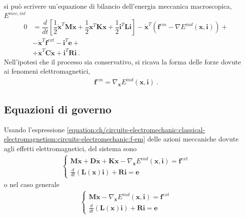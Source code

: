 \documentclass[letterpaper,10pt,english]{jupyterBook}
\begin{document}
\sphinxAtStartPar
si può scrivere un’equazione di bilancio dell’energia meccanica macroscopica, \(E^{mec, int}\)
\begin{equation*}
\begin{split}
0 & = \dfrac{d}{dt} \left[ \dfrac{1}{2} \dot{\mathbf{x}}^T \mathbf{M} \dot{\mathbf{x}} + \dfrac{1}{2} \mathbf{x}^T \mathbf{K} \mathbf{x} + \dfrac{1}{2} \mathbf{i}^T \mathbf{L} \mathbf{i} \right] - \dot{\mathbf{x}}^T \left( \mathbf{f}^{em} - \nabla E^{ind}(\mathbf{x}, \mathbf{i})  \right) + \\
  & - \dot{\mathbf{x}}^T \mathbf{f}^{ext} - \mathbf{i}^T \mathbf{e} + \\
  & + \dot{\mathbf{x}}^T \mathbf{C} \dot{\mathbf{x}} + \mathbf{i}^T \mathbf{R} \mathbf{i} \ .
\end{split}
\end{equation*}
\sphinxAtStartPar
Nell’ipotesi che il processo sia conservativo, si ricava la forma delle forze dovute ai fenomeni elettromagnetici,
\begin{equation}\label{equation:ch/circuits-electromechanic:classical-electromagnetism:circuits-electromechanic:f-em}
\begin{split}\mathbf{f}^{em} = \nabla_{\mathbf{x}} E^{ind}(\mathbf{x}, \mathbf{i}) \ .\end{split}
\end{equation}

\subsection{Equazioni di governo}
\label{\detokenize{ch/circuits-electromechanic:equazioni-di-governo}}
\sphinxAtStartPar
Usando l’espressione \eqref{equation:ch/circuits-electromechanic:classical-electromagnetism:circuits-electromechanic:f-em} delle azioni meccaniche dovute agli effetti elettromagnetici, del sistema sono
\begin{equation*}
\begin{split}\begin{cases}
  \mathbf{M} \ddot{\mathbf{x}} + \mathbf{D} \dot{\mathbf{x}} + \mathbf{K} \mathbf{x} - \nabla_{\mathbf{x}} E^{ind}(\mathbf{x}, \mathbf{i})  = \mathbf{f}^{ext} \\
  \frac{d}{dt} \left( \mathbf{L}(\mathbf{x}) \mathbf{i} \right) + \mathbf{R} \mathbf{i} = \mathbf{e}
\end{cases}\end{split}
\end{equation*}
\sphinxAtStartPar
o nel caso generale
\begin{equation*}
\begin{split}\begin{cases}
  \mathbf{M} \ddot{\mathbf{x}} - \nabla_{\mathbf{x}} E^{ind} ( \mathbf{x}, \mathbf{i}) = \mathbf{f}^{ext} \\
  \frac{d}{dt} \left( \mathbf{L}(\mathbf{x}) \mathbf{i} \right) + \mathbf{R} \mathbf{i} = \mathbf{e}
\end{cases}\end{split}
\end{equation*}
\end{document}
